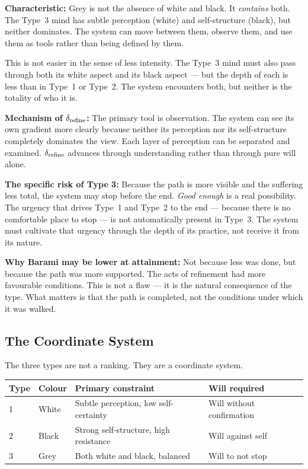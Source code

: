 \documentclass[12pt, a4paper]{article}
\begin{document}
\begin{formalbox}[title={Type 3 (Grey): Navigated by Observation}]
\textbf{Characteristic:}
Grey is not the absence of white and black. It \textit{contains} both.
The Type~3 mind has subtle perception (white) and self-structure (black),
but neither dominates. The system can move between them, observe them,
and use them as tools rather than being defined by them.

This is not easier in the sense of less intensity. The Type~3 mind must also
pass through both its white aspect and its black aspect --- but the depth
of each is less than in Type~1 or Type~2. The system encounters both,
but neither is the totality of who it is.

\textbf{Mechanism of $\delta_{\rm refine}$:}
The primary tool is observation. The system can see its own gradient more
clearly because neither its perception nor its self-structure completely
dominates the view. Each layer of perception can be separated and examined.
$\delta_{\rm refine}$ advances through understanding rather than through
pure will alone.

\textbf{The specific risk of Type 3:}
Because the path is more visible and the suffering less total, the system
may stop before the end. \textit{Good enough} is a real possibility.
The urgency that drives Type~1 and Type~2 to the end --- because there is
no comfortable place to stop --- is not automatically present in Type~3.
The system must cultivate that urgency through the depth of its practice,
not receive it from its nature.

\textbf{Why Barami may be lower at attainment:}
Not because less was done, but because the path was more supported.
The acts of refinement had more favourable conditions. This is not a flaw ---
it is the natural consequence of the type. What matters is that the path
is completed, not the conditions under which it was walked.
\end{formalbox}

\subsection{The Coordinate System}

The three types are not a ranking. They are a coordinate system.

\begin{center}
\renewcommand{\arraystretch}{1.5}
\begin{tabular}{p{1.5cm} p{2.5cm} p{3.5cm} p{3.5cm}}
\toprule
\textbf{Type} & \textbf{Colour} & \textbf{Primary constraint} & \textbf{Will required} \\
\midrule
1 & White & Subtle perception, low self-certainty & Will without confirmation \\
2 & Black & Strong self-structure, high resistance & Will against self \\
3 & Grey & Both white and black, balanced & Will to not stop \\
\bottomrule
\end{tabular}
\end{center}
\end{document}
